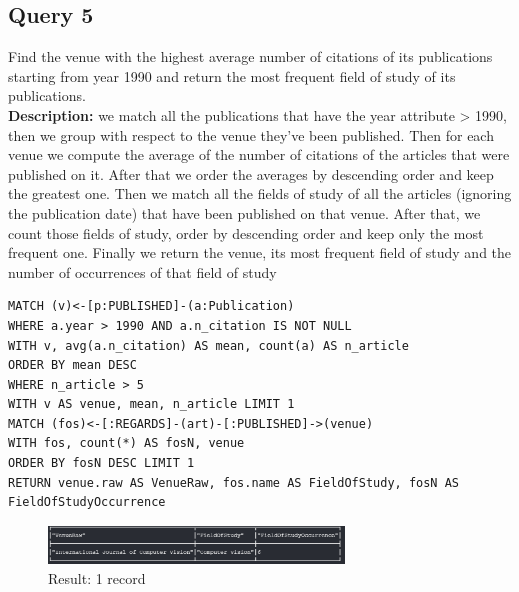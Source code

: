 \documentclass{Configuration_Files/PoliMi3i_thesis}
\begin{document}
\subsection{Query 5}
Find the venue with the highest average number of citations of its publications starting from year 1990 and return the most frequent field of study of its publications.\\
\textbf{Description:} we match all the publications that have the year attribute > 1990, then we group with respect to the venue they've been published.
Then for each venue we compute the average of the number of citations of the articles that were published on it.
After that we order the averages by descending order and keep the greatest one. Then we match all the fields of study of all the articles (ignoring the publication date)
that have been published on that venue. After that, we count those fields of study, order by descending order and keep only the most frequent one.
Finally we return the venue, its most frequent field of study and the number of occurrences of that field of study
\begin{lstlisting}[language=cypher, label=lst:cypher-example]
MATCH (v)<-[p:PUBLISHED]-(a:Publication)
WHERE a.year > 1990 AND a.n_citation IS NOT NULL
WITH v, avg(a.n_citation) AS mean, count(a) AS n_article
ORDER BY mean DESC
WHERE n_article > 5
WITH v AS venue, mean, n_article LIMIT 1
MATCH (fos)<-[:REGARDS]-(art)-[:PUBLISHED]->(venue)
WITH fos, count(*) AS fosN, venue
ORDER BY fosN DESC LIMIT 1
RETURN venue.raw AS VenueRaw, fos.name AS FieldOfStudy, fosN AS FieldOfStudyOccurrence
\end{lstlisting}
\begin{figure}[H]
\centering
\includegraphics[width=0.7\textwidth]{query/query5.PNG}
\caption{Result: 1 record}
\label{fig:query5}
\end{figure}
\end{document}
